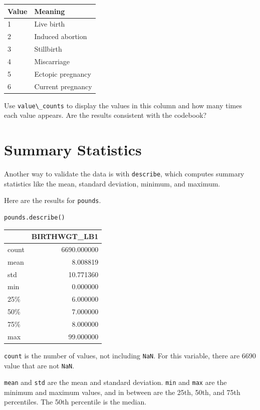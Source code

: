 \begin{longtable}[]{@{}ll@{}}
\midrule
Value & Meaning\tabularnewline
\midrule
\endhead
1 & Live birth\tabularnewline
2 & Induced abortion\tabularnewline
3 & Stillbirth\tabularnewline
4 & Miscarriage\tabularnewline
5 & Ectopic pregnancy\tabularnewline
6 & Current pregnancy\tabularnewline
\midrule
\end{longtable}

Use \passthrough{\lstinline!value\_counts!} to display the values in
this column and how many times each value appears. Are the results
consistent with the codebook?

\hypertarget{summary-statistics}{%
\section{Summary Statistics}\label{summary-statistics}}

Another way to validate the data is with
\passthrough{\lstinline!describe!}, which computes summary statistics
like the mean, standard deviation, minimum, and maximum.

Here are the results for \passthrough{\lstinline!pounds!}.

\begin{lstlisting}[]
pounds.describe()
\end{lstlisting}

\begin{tabular}{lr}
\midrule
{} &  BIRTHWGT\_LB1 \\
\midrule
count &   6690.000000 \\
mean  &      8.008819 \\
std   &     10.771360 \\
min   &      0.000000 \\
25\%   &      6.000000 \\
50\%   &      7.000000 \\
75\%   &      8.000000 \\
max   &     99.000000 \\
\midrule
\end{tabular}

\passthrough{\lstinline!count!} is the number of values, not including
\passthrough{\lstinline!NaN!}. For this variable, there are 6690 value
that are not \passthrough{\lstinline!NaN!}.

\passthrough{\lstinline!mean!} and \passthrough{\lstinline!std!} are the
mean and standard deviation. \passthrough{\lstinline!min!} and
\passthrough{\lstinline!max!} are the minimum and maximum values, and in
between are the 25th, 50th, and 75th percentiles. The 50th percentile is
the median.

